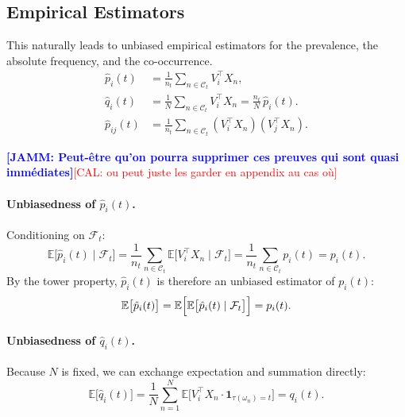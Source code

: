 \documentclass[
  journal=medium,
  manuscript=article-type,
  year=2025,
  volume=1,
]{cup-journal}
\newcommand{\JAMM}[1]{\textcolor{blue}{\textbf{[JAMM: #1]}}}
\begin{document}
\subsection{Empirical Estimators}
\label{sec:model:estimator}

This naturally leads to unbiased empirical estimators for the prevalence, the absolute frequency, and the co-occurrence.
\begin{align}
    \hat p_i(t) &= \frac{1}{n_t} \sum_{n \in \mathcal C_t} V_i^\top X_n,
    \label{eq:estimator_p}\\
    \hat q_i(t) &= \frac{1}{N} \sum_{n \in \mathcal C_t} V_i^\top X_n
                  = \frac{n_t}{N}\, \hat p_i(t).
    \label{eq:estimator_q} \\
    \hat p_{ij}(t) &= \frac{1}{n_t} \sum_{n\in\mathcal C_t} (V_i^\top X_n)(V_j^\top X_n).
\end{align}

\JAMM{Peut-être qu'on pourra supprimer ces preuves qui sont quasi immédiates}\textcolor{red}{[CAL: ou peut juste les garder en appendix au cas où]}
\paragraph{Unbiasedness of $\hat p_i(t)$.}
Conditioning on $\mathcal F_t$:
\begin{equation}
    \mathbb E\bigl[\hat p_i(t) \mid \mathcal F_t\bigr]
    = \frac{1}{n_t} \sum_{n \in \mathcal C_t} \mathbb E\bigl[V_i^\top X_n \mid \mathcal F_t\bigr]
    = \frac{1}{n_t} \sum_{n \in \mathcal C_t} p_i(t)
    = p_i(t).
\end{equation}
By the tower property, $\hat p_i(t)$ is therefore an unbiased estimator of
$p_i(t)$:
\begin{equation}
    \mathbb E\bigl[\hat p_i(t)\bigr]
    = \mathbb E\Bigl[\mathbb E\bigl[\hat p_i(t) \mid \mathcal F_t\bigr]\Bigr]
    = p_i(t).
\end{equation}

\paragraph{Unbiasedness of $\hat q_i(t)$.}
Because $N$ is fixed, we can exchange expectation and summation directly:
\begin{equation}
    \mathbb E\bigl[\hat q_i(t)\bigr]
    = \frac{1}{N} \sum_{n=1}^N \mathbb E\bigl[V_i^\top X_n \cdot \mathbf 1_{\tau(\omega_n) = t}\bigr]
    = q_i(t).
\end{equation}
\end{document}
